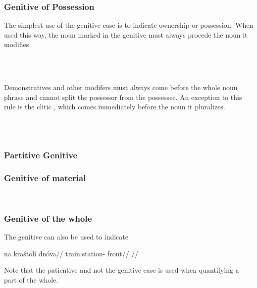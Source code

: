\subsubsection{Genitive of Possession}

The simplest use of the genitive case is to indicate ownership or possession.
When used this way, the noun marked in the genitive must always procede the noun
it modifies.


\pex
{}\\
\\
\xe

Demonstratives and other modifers must always come before
the whole noun phrase and cannot split the possessor from the possessee. An
exception to this rule is the clitic , which comes immediately before
the noun it pluralizes.

\pex
\a  {}\\
\a  {}\\
\xe

\subsubsection{Partitive Genitive}

\subsubsection{Genitive of material}

\ex
{}\\
\irdp{}{}
\xe

\subsubsection{Genitive of the whole}
The genitive can also be used to indicate

\pex
\begingl
\gla na kraštolí dn\'ova//
\glb {} train:station- front//
\glft {}//
\endgl
\xe

Note that the patientive and not the genitive case is used when quantifying a part of the whole.

